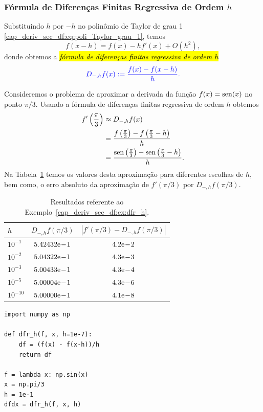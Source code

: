 \subsubsection{Fórmula de Diferenças Finitas Regressiva de Ordem $h$}

Substituindo $h$ por $-h$ no polinômio de Taylor de grau 1 \eqref{cap_deriv_sec_df:eq:poli_Taylor_grau_1}, temos
\begin{equation}
  f(x-h) = f(x) - hf'(x) + O(h^2),
\end{equation}
donde obtemos a \hl{\emph{fórmula de diferenças finitas regressiva de ordem $h$}}
\begin{equation}\label{cap_deriv_sec_df:eq:dfr_h}\color{blue}D_{-,h}f(x) := \frac{f(x) - f(x-h)}{h}.
\end{equation}

\begin{ex}\label{cap_deriv_sec_df:ex:dfr_h}
  Consideremos o problema de aproximar a derivada da função $f(x) = \operatorname{sen}(x)$ no ponto $\pi/3$. Usando a fórmula de diferenças finitas regressiva de ordem $h$ obtemos
  \begin{subequations}
    \begin{align}
      f'\left(\frac{\pi}{3}\right) &\approx D_{-,h}f(x) \\
                                   &= \frac{f\left(\frac{\pi}{3}\right)-f\left(\frac{\pi}{3}-h\right)}{h}\\
                                   &= \frac{\operatorname{sen}\left(\frac{\pi}{3}\right)-\operatorname{sen}\left(\frac{\pi}{3}-h\right)}{h}. 
    \end{align}
  \end{subequations}
Na Tabela~\ref{cap_deriv_sec_df:tab:ex_dfr_h} temos os valores desta aproximação para diferentes escolhas de $h$, bem como, o erro absoluto da aproximação de $f'(\pi/3)$ por $D_{-,h}f(\pi/3)$.

\begin{table}[h!]
  \centering
  \caption{Resultados referente ao Exemplo~\ref{cap_deriv_sec_df:ex:dfr_h}.}
  \begin{tabular}{l|c|c}
    $h$ & $D_{-,h}f(\pi/3)$ & $|f'(\pi/3)-D_{-,h}f(\pi/3)|$\\ \hline
    $10^{-1}$ & $5.42432\mathrm{e}\!-\!1$ & $4.2\mathrm{e}\!-\!2$ \\
    $10^{-2}$ & $5.04322\mathrm{e}\!-\!1$ & $4.3\mathrm{e}\!-\!3$ \\
    $10^{-3}$ & $5.00433\mathrm{e}\!-\!1$ & $4.3\mathrm{e}\!-\!4$ \\
    $10^{-5}$ & $5.00004\mathrm{e}\!-\!1$ & $4.3\mathrm{e}\!-\!6$ \\
    $10^{-10}$ & $5.00000\mathrm{e}\!-\!1$ & $4.1\mathrm{e}\!-\!8$ \\\hline
  \end{tabular}
  \label{cap_deriv_sec_df:tab:ex_dfr_h}
\end{table}

\begin{lstlisting}[caption=dfr\_h.py]
import numpy as np

def dfr_h(f, x, h=1e-7):
    df = (f(x) - f(x-h))/h
    return df

f = lambda x: np.sin(x)
x = np.pi/3
h = 1e-1
dfdx = dfr_h(f, x, h)
\end{lstlisting}
\end{ex}

